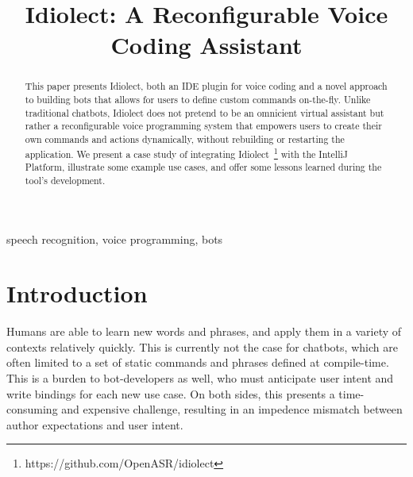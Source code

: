 \documentclass[conference]{IEEEtran}
\begin{document}
\title{Idiolect: A Reconfigurable Voice Coding Assistant}

\author{
\and
{}
\and
{}
\and
{}
}

\maketitle

\begin{abstract}
This paper presents Idiolect, both an IDE plugin for voice coding and a novel approach to building bots that allows for users to define custom commands on-the-fly. Unlike traditional chatbots, Idiolect does not pretend to be an omnicient virtual assistant but rather a reconfigurable voice programming system that empowers users to create their own commands and actions dynamically, without rebuilding or restarting the application. We present a case study of integrating Idiolect~\footnote{https://github.com/OpenASR/idiolect} with the IntelliJ Platform, illustrate some example use cases, and offer some lessons learned during the tool's development.
\end{abstract}

\begin{IEEEkeywords}
    speech recognition, voice programming, bots
\end{IEEEkeywords}

\section{Introduction}

Humans are able to learn new words and phrases, and apply them in a variety of contexts relatively quickly. This is currently not the case for chatbots, which are often limited to a set of static commands and phrases defined at compile-time. This is a burden to bot-developers as well, who must anticipate user intent and write bindings for each new use case. On both sides, this presents a time-consuming and expensive challenge, resulting in an impedence mismatch between author expectations and user intent.
\end{document}
